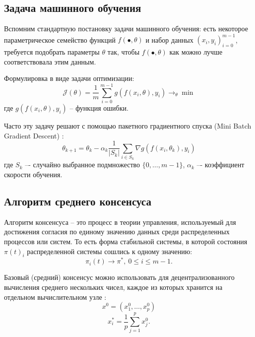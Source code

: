 \documentclass[a4paper,article,14pt]{extarticle}
\begin{document}
\subsection{Задача машинного обучения}
Вспомним стандартную постановку задачи машинного обучения: есть некоторое параметрическое семейство функций  $f(\bullet, \theta)$ и набор данных $(x_i, y_i)_{i=0}^{m-1}$, требуется подобрать параметры $\theta$ так, чтобы $f(\bullet, \theta)$ как можно лучше соответствовала этим данным.

Формулировка в виде задачи оптимизации:
 \begin{equation} \label{eq:ml_task}
 \mathcal{J}(\theta)=
 \frac{1}{m}\sum_{i=0}^{m-1}g(f(x_i, \theta), y_i)\rightarrow_{\theta}\min
 \end{equation}
где $g(f(x_i, \theta), y_i)$ -- функция ошибки.

Часто эту задачу решают с помощью пакетного градиентного спуска (Mini Batch Gradient Descent) \cite{mbgd}:
  \begin{equation} \label{eq:mbgd}
\theta_{k+1} = \theta_k - \alpha_k\frac{1}{|S_k|}\sum_{i\in S_k}\nabla g(f(x_i, \theta_k), y_i)
 \end{equation}
где $S_k$ –- случайно выбранное подмножество $\{0, \ldots, m-1\}$, $\alpha_k$ –- коэффициент скорости обучения.

\subsection{Алгоритм среднего консенсуса}

Алгоритм консенсуса -- это процесс в теории управления, используемый для достижения согласия по единому значению данных среди распределенных процессов или систем. То есть форма стабильной системы, в которой состояния $\pi(t)_i$ распределенной системы сошлись к одному значению:
\begin{equation}
\pi_i(t)\rightarrow \pi^*,~0\leq i\leq m-1.
\end{equation}

Базовый (средний) консенсус можно использовать для децентрализованного вычисления среднего нескольких чисел, каждое из которых хранится на отдельном вычислительном узле \cite{consensus_basics}:
\begin{equation}
x^0 = (x_1^0, \ldots, x_p^0)
\end{equation}
\begin{equation}
x_i^* = \frac{1}{p}\sum_{j=1}^{p}x_j^0.
\end{equation}
\end{document}
